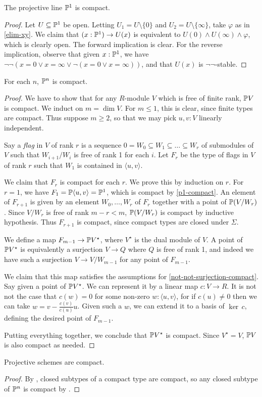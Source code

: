 \begin{theorem}\label{p1-compact}
	The projective line $\mathbb{P}^1$ is compact.
\end{theorem}
\begin{proof}
	Let $U \subseteq \mathbb{P}^1$ be open. Letting $U_1 = U \setminus\{0\}$ and
	$U_2 = U\setminus\{\infty\}$, take $\varphi$ as in \cref{elim-xy}.
	We claim that $(x : \mathbb{P}^1) \to U(x)$ is equivalent to
	$U(0) \wedge U(\infty) \wedge \varphi$, which is clearly open.
	The forward implication is clear. For the reverse implication,
	observe that given $x : \mathbb{P}^1$, we have
	$\neg \neg(x = 0 \vee x = \infty \vee \neg (x = 0 \vee x = \infty))$,
	and that $U(x)$ is $\neg \neg$-stable.
\end{proof}

\begin{theorem}
  \label{Pn-compact}
	For each $n$, $\mathbb{P}^n$ is compact.
\end{theorem}
\begin{proof}
	We have to show that for any $R$-module $V$ which is free of finite rank,
	$\mathbb{P} V$ is compact. We induct on $m = \dim V$.
	For $m\le 1$, this is clear, since finite types are compact.
	Thus suppose $m \ge 2$, so that we may pick $u,v : V$ linearly independent.

	Say a \emph{flag} in $V$ of rank $r$ is a sequence
	$0 = W_0 \subseteq W_1 \subseteq \ldots \subseteq W_r$
	of submodules of $V$ such that $W_{i+1} / W_i$ is free of rank 1 for each $i$.
	Let $F_r$ be the type of flags in $V$ of rank $r$ such that $W_1$ is
	contained in $\langle u,v\rangle$.

	We claim that $F_r$ is compact for each $r$. We prove this by induction on $r$.
	For $r = 1$, we have $F_1 = \mathbb{P} \langle u, v \rangle = \mathbb{P}^1$, which
	is compact by \cref{p1-compact}.
	An element of $F_{r+1}$ is given by an element $W_0,\ldots,W_r$ of $F_r$
	together with a point of $\mathbb{P} (V / W_r)$.
	Since $V / W_r$ is free of rank $m - r < m$, $\mathbb{P}(V/W_r)$ is compact by inductive
	hypothesis. Thus $F_{r+1}$ is compact, since compact types are closed under $\Sigma$.

	We define a map $F_{m-1} \to \mathbb{P} V^\star$, where $V^\star$ is the dual module of $V$.
	A point of $\mathbb{P} V^\star$ is equivalently a surjection
	$V \to Q$ where $Q$ is free of rank 1, and indeed we have such a
	surjection $V \to V/W_{m-1}$ for any point of $F_{m-1}$.
	
	We claim that this map satisfies the assumptions for \cref{not-not-surjection-compact}.
	Say given a point of $\mathbb{P} V^\star$. We can represent it
	by a linear map $c : V \to R$. It is not not the case that
	$c(w) = 0$ for some non-zero $w : \langle u, v \rangle$, for
	if $c(u) \ne 0$ then we can take $w = v - \frac{c(v)}{c(u)} u$.
	Given such a $w$, we can extend it to a basis of $\ker\, c$, defining the
	desired point of $F_{m-1}$.

	Putting everything together, we conclude that $\mathbb{P} V^\star$ is compact.
	Since $V^\star = V$, $\mathbb{P} V$ is also compact as needed.
\end{proof}

\begin{theorem}
  Projective schemes are compact.
\end{theorem}

\begin{proof}
  By ,  closed subtypes of a compact type are compact,
  so any closed subtype of $\mathbb{P}^n$ is compact by .
\end{proof}
